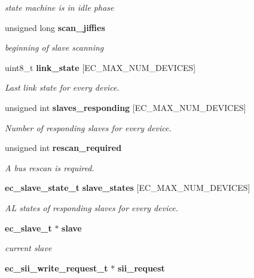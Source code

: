 \begin{DoxyCompactItemize}
\begin{DoxyCompactList}\small\item\em state machine is in idle phase \end{DoxyCompactList}\item 
unsigned long {\bf scan\-\_\-jiffies}\label{structec__fsm__master_acf6f1bd6e82f2947e181ed23f9d5f6f9}

\begin{DoxyCompactList}\small\item\em beginning of slave scanning \end{DoxyCompactList}\item 
uint8\-\_\-t {\bf link\-\_\-state} [\-E\-C\-\_\-\-M\-A\-X\-\_\-\-N\-U\-M\-\_\-\-D\-E\-V\-I\-C\-E\-S]
\begin{DoxyCompactList}\small\item\em \-Last link state for every device. \end{DoxyCompactList}\item 
unsigned int {\bf slaves\-\_\-responding} [\-E\-C\-\_\-\-M\-A\-X\-\_\-\-N\-U\-M\-\_\-\-D\-E\-V\-I\-C\-E\-S]
\begin{DoxyCompactList}\small\item\em \-Number of responding slaves for every device. \end{DoxyCompactList}\item 
unsigned int {\bf rescan\-\_\-required}
\begin{DoxyCompactList}\small\item\em \-A bus rescan is required. \end{DoxyCompactList}\item 
{\bf ec\-\_\-slave\-\_\-state\-\_\-t} {\bf slave\-\_\-states} [\-E\-C\-\_\-\-M\-A\-X\-\_\-\-N\-U\-M\-\_\-\-D\-E\-V\-I\-C\-E\-S]
\begin{DoxyCompactList}\small\item\em \-A\-L states of responding slaves for every device. \end{DoxyCompactList}\item 
{\bf ec\-\_\-slave\-\_\-t} $\ast$ {\bf slave}\label{structec__fsm__master_aaa3d10bbf5af6278cec37fcd7b771372}

\begin{DoxyCompactList}\small\item\em current slave \end{DoxyCompactList}\item 
{\bf ec\-\_\-sii\-\_\-write\-\_\-request\-\_\-t} $\ast$ {\bf sii\-\_\-request}\label{structec__fsm__master_a0e8413b9433f4223911da952e2e26a7a}


\end{DoxyCompactItemize}
